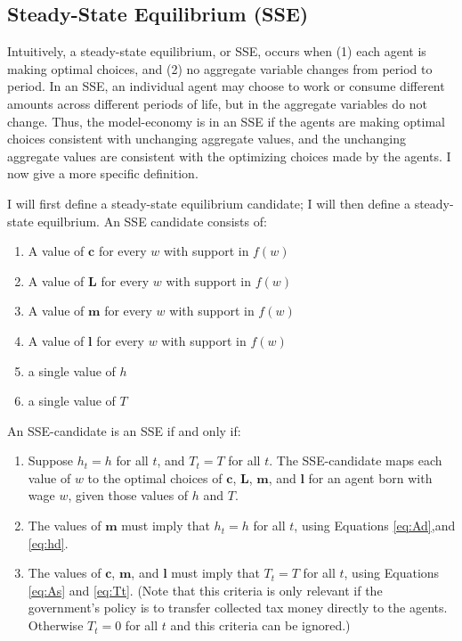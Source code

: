 \documentclass[letter, 12pt, epsf,leqno]{article}
\begin{document}
\subsection{Steady-State Equilibrium (SSE)}

Intuitively, a steady-state equilibrium, or SSE, occurs when (1) each agent is making optimal choices, and (2) no aggregate variable changes from period to period.  In an SSE, an individual agent may choose to work or consume different amounts across different periods of life, but in the aggregate variables do not change.  Thus, the model-economy is in an SSE if the agents are making optimal choices consistent with unchanging aggregate values, and the unchanging aggregate values are consistent with the optimizing choices made by the agents.  I now give a more specific definition.


I will first define a steady-state equilibrium candidate; I will then define a steady-state equilbrium.  An SSE candidate consists of:

\begin{enumerate}
\item A value of $\boldsymbol{c}$ for every $w$ with support in $f(w)$
\item A value of $\boldsymbol{L}$ for every $w$ with support in $f(w)$
\item A value of $\boldsymbol{m}$ for every $w$ with support in $f(w)$
\item A value of $\boldsymbol{l}$ for every $w$ with support in $f(w)$
\item a single value of $h$
\item a single value of $T$
\end{enumerate}

An SSE-candidate is an SSE if and only if:
\begin{enumerate}
\item  Suppose $h_t=h$ for all $t$, and $T_t=T$ for all $t$.  The SSE-candidate maps each value of $w$ to the optimal choices of $\boldsymbol{c}$, $\boldsymbol{L}$, $\boldsymbol{m}$, and $\boldsymbol{l}$ for an agent born with wage $w$, given those values of $h$ and $T$.
\item   The values of $\boldsymbol{m}$ must imply that $h_t=h$ for all $t$, using Equations \ref{eq:Ad},and \ref{eq:hd}.
\item  The values of $\boldsymbol{c}$, $\boldsymbol{m}$, and $\boldsymbol{l}$ must imply that $T_t=T$ for all $t$, using Equations \ref{eq:As} and \ref{eq:Tt}.  (Note that this criteria is only relevant if the government's policy is to transfer collected tax money directly to the agents.  Otherwise $T_t=0$ for all $t$ and this criteria can be ignored.)
\end{enumerate}
\end{document}

